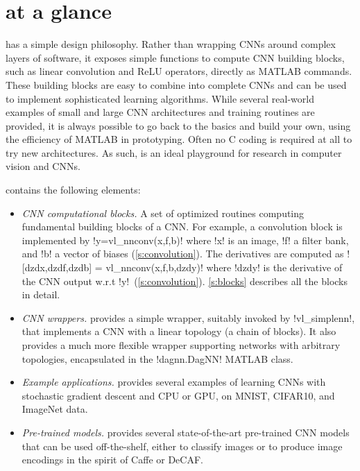 \section{\matconvnet at a glance}\label{s:vlnn}

\matconvnet has a simple design philosophy. Rather than wrapping CNNs around complex layers of software, it exposes simple functions to compute CNN building blocks, such as linear convolution and ReLU operators, directly as MATLAB commands. These building blocks are easy to combine into complete CNNs and can be used to implement sophisticated learning algorithms. While several real-world examples of small and large CNN architectures and training routines are provided, it is always possible to go back to the basics and build your own, using the efficiency of MATLAB in prototyping. Often no C coding is required at all to try new architectures. As such, \matconvnet is an ideal playground for research in computer vision and CNNs.

\matconvnet contains the following elements:
\begin{itemize}
\item \emph{CNN computational blocks.} A set of optimized routines computing fundamental building blocks of a CNN. For example, a convolution block is implemented by \linebreak !y=vl_nnconv(x,f,b)! where !x! is an image, !f! a filter bank, and !b! a vector of biases (\cref{s:convolution}). The derivatives are computed as
![dzdx,dzdf,dzdb] = vl_nnconv(x,f,b,dzdy)! where !dzdy! is the derivative of the CNN output w.r.t !y!~(\cref{s:convolution}). \cref{s:blocks} describes all the blocks in detail.
\item \emph{CNN wrappers.} \matconvnet provides a simple wrapper, suitably invoked by !vl_simplenn!, that implements a CNN with a linear topology (a chain of blocks). It also provides a much more flexible wrapper supporting networks with arbitrary topologies, encapsulated in the !dagnn.DagNN! MATLAB class.
\item \emph{Example applications.} \matconvnet provides several examples of learning CNNs with stochastic gradient descent and CPU or GPU, on MNIST, CIFAR10, and ImageNet data.
\item \emph{Pre-trained models.} \matconvnet provides several state-of-the-art pre-trained CNN models that can be used off-the-shelf, either to classify images or to produce image encodings in the spirit of Caffe or DeCAF.
\end{itemize}

